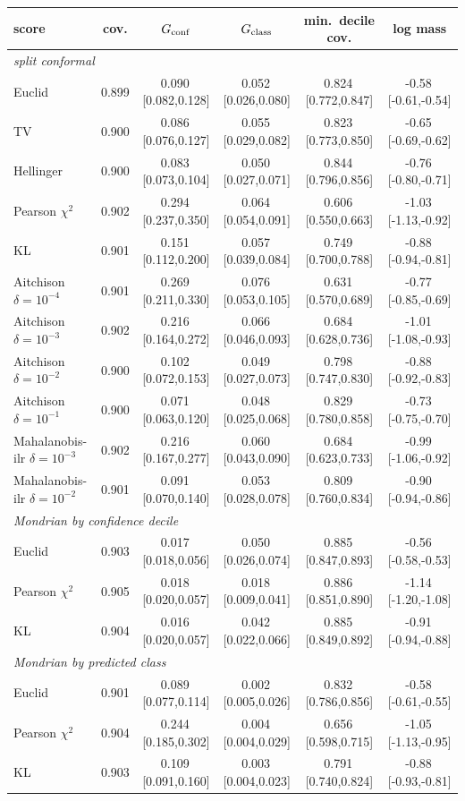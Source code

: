 \begin{tabular}{lccccc}\toprule
score & cov. & $G_{\rm conf}$ & $G_{\rm class}$ & min.\ decile cov. & log mass\\\midrule
\multicolumn{6}{l}{\emph{split conformal}}\\
Euclid & 0.899 & 0.090\,[0.082,0.128] & 0.052\,[0.026,0.080] & 0.824\,[0.772,0.847] & -0.58\,[-0.61,-0.54]\\
TV & 0.900 & 0.086\,[0.076,0.127] & 0.055\,[0.029,0.082] & 0.823\,[0.773,0.850] & -0.65\,[-0.69,-0.62]\\
Hellinger & 0.900 & 0.083\,[0.073,0.104] & 0.050\,[0.027,0.071] & 0.844\,[0.796,0.856] & -0.76\,[-0.80,-0.71]\\
Pearson $\chi^2$ & 0.902 & 0.294\,[0.237,0.350] & 0.064\,[0.054,0.091] & 0.606\,[0.550,0.663] & -1.03\,[-1.13,-0.92]\\
KL & 0.901 & 0.151\,[0.112,0.200] & 0.057\,[0.039,0.084] & 0.749\,[0.700,0.788] & -0.88\,[-0.94,-0.81]\\
Aitchison $\delta{=}10^{-4}$ & 0.901 & 0.269\,[0.211,0.330] & 0.076\,[0.053,0.105] & 0.631\,[0.570,0.689] & -0.77\,[-0.85,-0.69]\\
Aitchison $\delta{=}10^{-3}$ & 0.902 & 0.216\,[0.164,0.272] & 0.066\,[0.046,0.093] & 0.684\,[0.628,0.736] & -1.01\,[-1.08,-0.93]\\
Aitchison $\delta{=}10^{-2}$ & 0.900 & 0.102\,[0.072,0.153] & 0.049\,[0.027,0.073] & 0.798\,[0.747,0.830] & -0.88\,[-0.92,-0.83]\\
Aitchison $\delta{=}10^{-1}$ & 0.900 & 0.071\,[0.063,0.120] & 0.048\,[0.025,0.068] & 0.829\,[0.780,0.858] & -0.73\,[-0.75,-0.70]\\
Mahalanobis-ilr $\delta{=}10^{-3}$ & 0.902 & 0.216\,[0.167,0.277] & 0.060\,[0.043,0.090] & 0.684\,[0.623,0.733] & -0.99\,[-1.06,-0.92]\\
Mahalanobis-ilr $\delta{=}10^{-2}$ & 0.901 & 0.091\,[0.070,0.140] & 0.053\,[0.028,0.078] & 0.809\,[0.760,0.834] & -0.90\,[-0.94,-0.86]\\
\multicolumn{6}{l}{\emph{Mondrian by confidence decile}}\\
Euclid & 0.903 & 0.017\,[0.018,0.056] & 0.050\,[0.026,0.074] & 0.885\,[0.847,0.893] & -0.56\,[-0.58,-0.53]\\
Pearson $\chi^2$ & 0.905 & 0.018\,[0.020,0.057] & 0.018\,[0.009,0.041] & 0.886\,[0.851,0.890] & -1.14\,[-1.20,-1.08]\\
KL & 0.904 & 0.016\,[0.020,0.057] & 0.042\,[0.022,0.066] & 0.885\,[0.849,0.892] & -0.91\,[-0.94,-0.88]\\
\multicolumn{6}{l}{\emph{Mondrian by predicted class}}\\
Euclid & 0.901 & 0.089\,[0.077,0.114] & 0.002\,[0.005,0.026] & 0.832\,[0.786,0.856] & -0.58\,[-0.61,-0.55]\\
Pearson $\chi^2$ & 0.904 & 0.244\,[0.185,0.302] & 0.004\,[0.004,0.029] & 0.656\,[0.598,0.715] & -1.05\,[-1.13,-0.95]\\
KL & 0.903 & 0.109\,[0.091,0.160] & 0.003\,[0.004,0.023] & 0.791\,[0.740,0.824] & -0.88\,[-0.93,-0.81]\\
\bottomrule\end{tabular}
